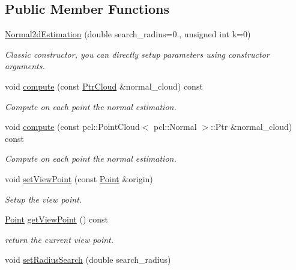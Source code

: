 \subsection*{Public Member Functions}
\begin{DoxyCompactItemize}
\item 
\hyperlink{classNormal2dEstimation_ac93035a8de2a45651571f7f6022f18b7}{Normal2d\+Estimation} (double search\+\_\+radius=0., unsigned int k=0)
\begin{DoxyCompactList}\small\item\em Classic constructor, you can directly setup parameters using constructor arguments. \end{DoxyCompactList}\item 
void \hyperlink{classNormal2dEstimation_a908d3a85cda5b29bb3ef119ab30d6ab6}{compute} (const \hyperlink{Normal2dEstimation_8h_a2894055ff89c63cbae90e22dfddaa610}{Ptr\+Cloud} \&normal\+\_\+cloud) const
\begin{DoxyCompactList}\small\item\em Compute on each point the normal estimation. \end{DoxyCompactList}\item 
void \hyperlink{classNormal2dEstimation_ac3fd17679a20a7f4faab72f58fdc6199}{compute} (const pcl\+::\+Point\+Cloud$<$ pcl\+::\+Normal $>$\+::Ptr \&normal\+\_\+cloud) const
\begin{DoxyCompactList}\small\item\em Compute on each point the normal estimation. \end{DoxyCompactList}\item 
void \hyperlink{classNormal2dEstimation_ad05b65f35c4aa0b1511bf81e5a70b36d}{set\+View\+Point} (const \hyperlink{Normal2dEstimation_8h_ab8d898f36957cca40634530a6f118a3e}{Point} \&origin)
\begin{DoxyCompactList}\small\item\em Setup the view point. \end{DoxyCompactList}\item 
\hyperlink{Normal2dEstimation_8h_ab8d898f36957cca40634530a6f118a3e}{Point} \hyperlink{classNormal2dEstimation_a9a8b5ac0f03023a476f7986cf06c8f96}{get\+View\+Point} () const
\begin{DoxyCompactList}\small\item\em return the current view point. \end{DoxyCompactList}\item 
void \hyperlink{classNormal2dEstimation_aebdbc9d5d5cabd269522f42af9d1552f}{set\+Radius\+Search} (double search\+\_\+radius)

\end{DoxyCompactItemize}
